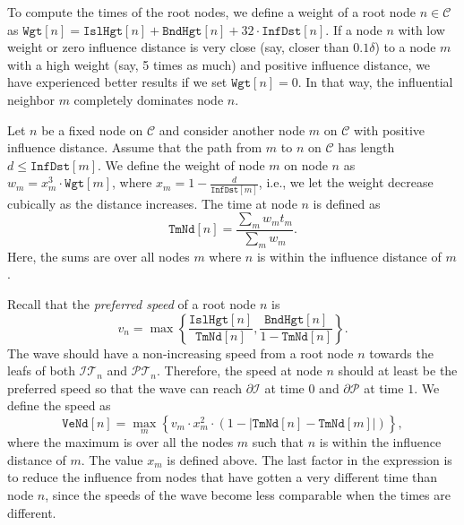 \documentclass[3p]{elsarticle}
\newcommand{\PP}{\mathcal{P}}
\newcommand{\HH}{\mathcal{I}}
\newcommand{\CC}{\mathcal{C}}
\newcommand{\TT}{\mathcal{T}}
\newcommand{\PT}{\PP\TT}
\newcommand{\HT}{\HH\TT}
\newcommand{\stepover}{\delta}
\newcommand{\ttimeO}{\texttt{TmNd}}
\newcommand{\speedO}{\texttt{VeNd}}
\newcommand{\height}{\texttt{Hgt}}
\newcommand{\holeHeight}{\texttt{Isl}\height}
\newcommand{\boundaryHeight}{\texttt{Bnd}\height}
\newcommand{\inflDist}{\texttt{InfDst}}
\newcommand{\weight}{\texttt{Wgt}}
\begin{document}
To compute the times of the root nodes,
we define a weight of a root node $n\in\CC$ as
$\weight[n]=\holeHeight[n]+\boundaryHeight[n]+32\cdot\inflDist[n]$.
If a node $n$ with low weight or zero influence distance is very close (say, closer than $0.1\stepover$)
to a node $m$ with a high weight
(say, 5 times as much) and positive influence distance, we have experienced better results
if we set $\weight[n]=0$. In that way, the influential neighbor $m$ completely dominates node $n$.

Let $n$ be a fixed node on $\CC$
and consider another node $m$ on $\CC$ with positive influence distance.
Assume that the path
from $m$ to $n$ on $\CC$ has length $d\leq\inflDist[m]$.
We define the
weight of node $m$ on node $n$ as
$w_m=x_m^3\cdot\weight[m]$, where $x_m=1-\frac d{\inflDist[m]}$,
i.e., we let the weight decrease cubically as the distance increases.
The time at node $n$ is defined as
$$
\ttimeO[n]=\frac{\sum_m w_mt_m}{\sum_m w_m}.
$$
Here, the sums are over all nodes $m$ where $n$ is within the influence distance of $m$.

Recall that the \emph{preferred speed} of a root node $n$ is
$$v_n=\max\left\{\frac{\holeHeight[n]}{\ttimeO[n]},
\frac{\boundaryHeight[n]}{1-\ttimeO[n]}\right\}.$$
The wave should have a non-increasing speed from a root node $n$
towards the leafs of both $\HT_n$ and $\PT_n$.
Therefore, the speed at node $n$ should at least be the preferred speed
so that the wave can reach $\partial\HH$ at time $0$ and $\partial\PP$ at time $1$.
We define the speed as
$$
\speedO[n]=\max_m \left\{ v_m\cdot x_m^2\cdot (1-\lvert\ttimeO[n]-\ttimeO[m]\rvert)\right\},
$$
where the maximum is over all the nodes $m$ such that $n$ is within the influence distance of $m$.
The value $x_m$ is defined above.
The last factor in the expression is to reduce the influence from nodes that have gotten a
very different time than node $n$, since the speeds of the wave become less comparable
when the times are different.
\end{document}
